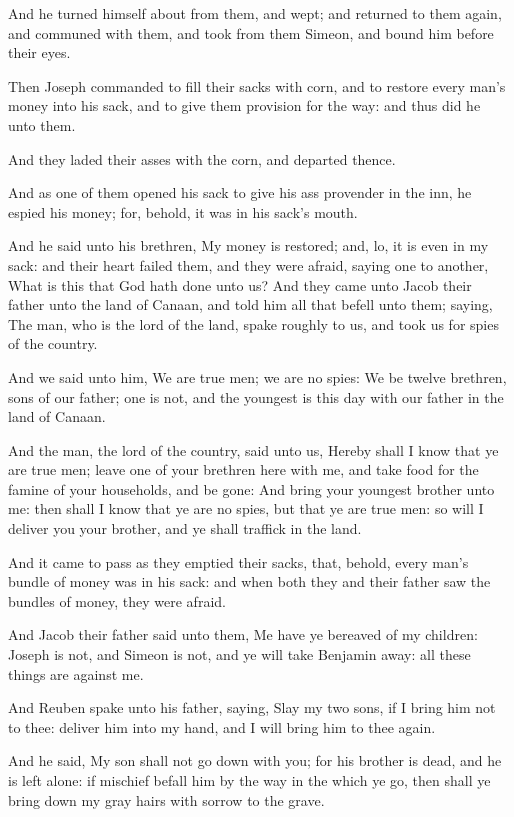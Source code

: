 \Verse And he turned himself about from them, and wept; and returned to them again, and communed with them, and took from them Simeon, and bound him before their eyes.

\Verse Then Joseph commanded to fill their sacks with corn, and to restore every man's money into his sack, and to give them provision for the way: and thus did he unto them.

\Verse And they laded their asses with the corn, and departed thence.

\Verse And as one of them opened his sack to give his ass provender in the inn, he espied his money; for, behold, it was in his sack's mouth.

\Verse And he said unto his brethren, My money is restored; and, lo, it is even in my sack: and their heart failed them, and they were afraid, saying one to another, What is this that God hath done unto us?  \Verse And they came unto Jacob their father unto the land of Canaan, and told him all that befell unto them; saying, \Verse The man, who is the lord of the land, spake roughly to us, and took us for spies of the country.

\Verse And we said unto him, We are true men; we are no spies: \Verse We be twelve brethren, sons of our father; one is not, and the youngest is this day with our father in the land of Canaan.

\Verse And the man, the lord of the country, said unto us, Hereby shall I know that ye are true men; leave one of your brethren here with me, and take food for the famine of your households, and be gone: \Verse And bring your youngest brother unto me: then shall I know that ye are no spies, but that ye are true men: so will I deliver you your brother, and ye shall traffick in the land.

\Verse And it came to pass as they emptied their sacks, that, behold, every man's bundle of money was in his sack: and when both they and their father saw the bundles of money, they were afraid.

\Verse And Jacob their father said unto them, Me have ye bereaved of my children: Joseph is not, and Simeon is not, and ye will take Benjamin away: all these things are against me.

\Verse And Reuben spake unto his father, saying, Slay my two sons, if I bring him not to thee: deliver him into my hand, and I will bring him to thee again.

\Verse And he said, My son shall not go down with you; for his brother is dead, and he is left alone: if mischief befall him by the way in the which ye go, then shall ye bring down my gray hairs with sorrow to the grave.


